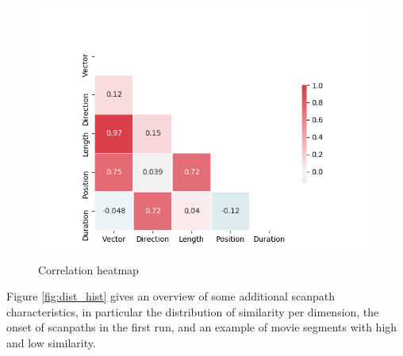 \documentclass[a4paper, 12pt]{scrreprt}
\begin{document}
\begin{figure}
	\includegraphics{img/sim_corr.png}
	\caption{Correlation heatmap}
	\label{fig:corrs}
\end{figure}


Figure \ref{fig:dist_hist} gives an overview of some additional scanpath characteristics, in particular the distribution of similarity per dimension, the onset of scanpaths in the first run, and an example of movie segments with high and low similarity.
\end{document}
